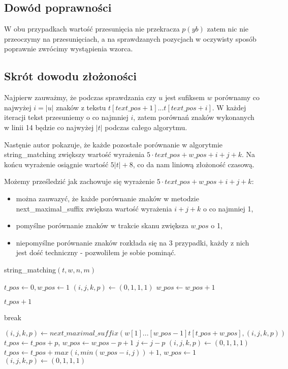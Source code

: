 \documentclass[a4paper,11pt]{article}
\theoremstyle{definition}
\begin{document}
\subsection{Dowód poprawności}
W obu przypadkach wartość przesunięcia nie przekracza $p(yb)$ zatem nic nie przeoczymy na przesunięciach, a na sprawdzanych pozycjach w oczywisty sposób poprawnie zwrócimy wystąpienia wzorca.

\subsection{Skrót dowodu złożoności}
Najpierw zauważmy, że podczas sprawdzania czy $u$ jest sufiksem $w$ porównamy co najwyżej $i = |u|$ znaków z tekstu $t[text\_pos + 1]...t[text\_pos + i]$. W każdej iteracji tekst przesuniemy o co najmniej $i$, zatem porównań znaków wykonanych w linii 14 będzie co najwyżej $|t|$ podczas całego algorytmu. 

Nastęnie autor pokazuje, że każde pozostałe porównanie w algorytmie string\_matching zwiększy wartość wyrażenia $5 \cdot text\_pos + w\_pos + i + j + k$. Na końcu wyrażenie osiągnie wartość $5|t| + 8$, co da nam liniową złożoność czasową.

Możemy prześledzić jak zachowuje się wyrażenie $5 \cdot text\_pos + w\_pos + i + j + k$:
\begin{itemize}
    \item można zauwazyć, że każde porównanie znaków w metodzie next\_maximal\_suffix zwiększa wartość wyrażenia $i + j + k$ o co najmniej 1,
    \item pomyślne porównanie znaków w trakcie skanu zwiększa $w\_pos$ o 1,
    \item niepomyślne porównanie znaków rozkłada się na 3 przypadki, każdy z nich jest dość techniczny - pozwoliłem je sobie pominąć.
\end{itemize}

\begin{algorithm}[H]
\caption{string\_matching$(t, w, n, m)$}
\begin{algorithmic}[1]
\STATE $t\_pos \gets 0,  w\_pos \gets 1$
\STATE $(i,j,k,p) \gets (0,1,1,1)$
        \STATE $ w\_pos \gets  w\_pos + 1$
    \ENDWHILE
    
        \RETURN $t\_pos + 1$
    \ENDIF
    
        \STATE break
    \ENDIF
    
    \STATE $(i,j,k,p) \gets next\_maximal\_suffix(w[1]...[ w\_pos-1]t[t\_pos +  w\_pos], (i, j, k, p))$
        \STATE $t\_pos \gets t\_pos + p$, $ w\_pos \gets  w\_pos - p + 1$
            \STATE $j \gets j - p$
        \ELSE
            \STATE $(i,j,k,p) \gets (0,1,1,1)$
        \ENDIF
    \ELSE
        \STATE $t\_pos \gets t\_pos + max(i, min( w\_pos - i, j)) + 1$, $ w\_pos \gets 1$
        \STATE $(i,j,k,p) \gets (0,1,1,1)$
    \ENDIF
\ENDWHILE

\end{algorithmic}
\end{algorithm}
\end{document}
